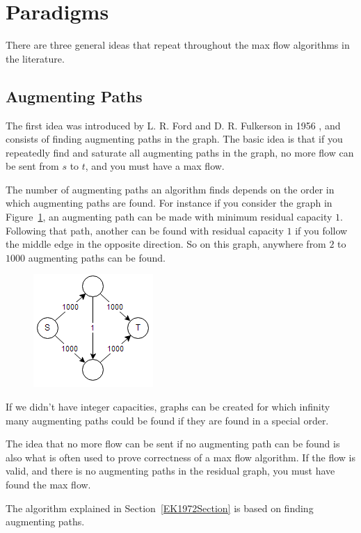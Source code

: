 
\section{Paradigms}
\label{ParadigmsSection}

There are three general ideas that repeat throughout the max flow algorithms in the literature.


\subsection{Augmenting Paths}
The first idea was introduced by L. R. Ford and D. R. Fulkerson in 1956 \cite{FordFulkerson}, and consists of finding augmenting paths in the graph.
The basic idea is that if you repeatedly find and saturate all augmenting paths in the graph, no more flow can be sent from $s$ to $t$, and you must have a max flow.

The number of augmenting paths an algorithm finds depends on the order in which augmenting paths are found. 
For instance if you consider the graph in Figure~\ref{augmentingPathsExample}, an augmenting path can be made with minimum residual capacity $1$.
Following that path, another can be found with residual capacity $1$ if you follow the middle edge in the opposite direction.
So on this graph, anywhere from $2$ to $1000$ augmenting paths can be found.
\begin{figure}[ht!]
\centering
\includegraphics{augmentingPathsExample.png}
\caption{}
\label{augmentingPathsExample}
\end{figure}
If we didn't have integer capacities, graphs can be created for which infinity many augmenting paths could be found if they are found in a special order.

The idea that no more flow can be sent if no augmenting path can be found is also what is often used to prove correctness of a max flow algorithm. 
If the flow is valid, and there is no augmenting paths in the residual graph, you must have found the max flow.

The algorithm explained in Section~\ref{EK1972Section} is based on finding augmenting paths.

